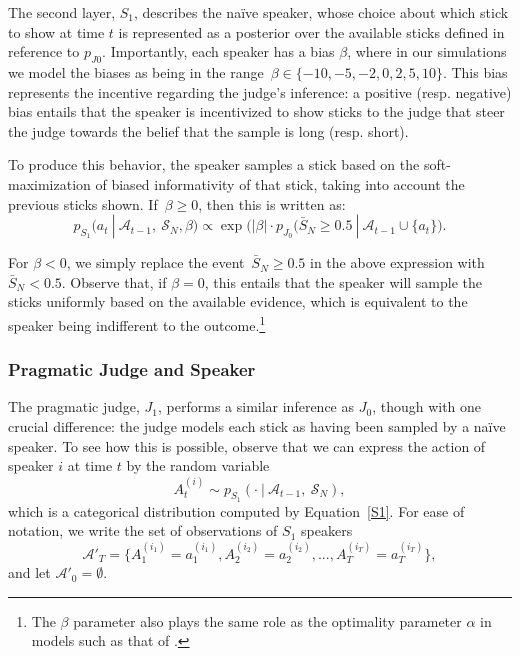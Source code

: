 \documentclass[10pt,letterpaper]{article}
\begin{document}
The second layer, $S_1$, describes the na\"ive speaker, whose choice about which stick to show
at time $t$ is represented as a posterior over the available sticks defined in reference to $p_{J0}$.
Importantly, each speaker has a bias $\beta$, where in our simulations we model the biases as being
in the range~${\beta \in \{-10, -5, -2, 0, 2, 5, 10\}}$. This bias represents the incentive regarding the judge's
inference: a positive (resp. negative) bias entails that the speaker is incentivized to show sticks to the judge
that steer the judge towards the belief that the sample is long (resp. short).

To produce this behavior, the speaker samples a stick based on the soft-maximization of biased informativity
of that stick, taking into account the previous sticks shown. If~${\beta\ge 0}$, then this is written as:
\begin{equation}\label{S1}
p_{S_1} (a_t \ | \ \mathcal{A}_{t-1},\ \mathcal{S}_N, \beta) \propto \exp \bigl(\lvert\beta\rvert \cdot p_{J_0} (\bar{S}_N \ge 0.5 \ | \ \mathcal{A}_{t-1} \cup \{a_t\} \bigr).
\end{equation}

For $\beta<0$, we simply replace the event~${\bar{S}_N \ge 0.5}$ in the above expression with~${\bar{S}_N < 0.5}$.
Observe that, if $\beta = 0$, this entails that the speaker will sample the sticks uniformly based on the available
evidence, which is equivalent to the speaker being indifferent to the outcome.\footnote{The $\beta$ parameter also 
plays the same role as the optimality parameter $\alpha$ in models such as that of .}

\subsubsection{Pragmatic Judge and Speaker}
The pragmatic judge, $J_1$, performs a similar inference as $J_0$, though with one crucial difference: the judge
models each stick as having been sampled by a na\"ive speaker. To see how this is possible, observe that we can express
the action of speaker $i$ at time $t$ by the random variable 
\begin{equation}
	A_t^{(i)} \sim p_{S_1} (\cdot \ | \ \mathcal{A}_{t-1},\ \mathcal{S}_N),
\end{equation}
which is a categorical distribution computed by Equation~\ref{S1}. For ease of notation, we write the set
of observations of $S_1$ speakers
\begin{equation}
	\mathcal{A}'_T = \{ A_1^{(i_1)}=a_1^{(i_1)}, A_2^{(i_2)}=a_2^{(i_2)}, ..., A_T^{(i_T)}=a_T^{(i_T)}\}, 
\end{equation}
and let $\mathcal{A}'_0 = \emptyset$.
\end{document}
